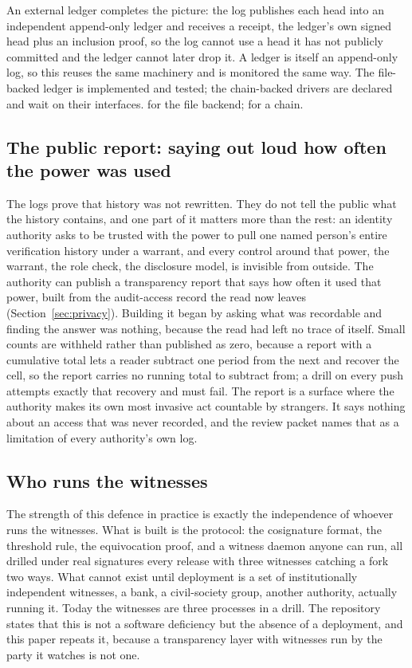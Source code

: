 An external ledger completes the picture: the log publishes each head into an independent
append-only ledger and receives a receipt, the ledger's own signed head plus an inclusion proof, so
the log cannot use a head it has not publicly committed and the ledger cannot later drop it. A
ledger is itself an append-only log, so this reuses the same machinery and is monitored the same
way. The file-backed ledger is implemented and tested; the chain-backed drivers are declared and wait
on their interfaces. \sImplMark{} for the file backend; \sFut{} for a chain.

\subsection{The public report: saying out loud how often the power was used}

The logs prove that history was not rewritten. They do not tell the public what the history
contains, and one part of it matters more than the rest: an identity authority asks to be trusted
with the power to pull one named person's entire verification history under a warrant, and every
control around that power, the warrant, the role check, the disclosure model, is invisible from
outside. The authority can publish a transparency report that says how often it
used that power, built from the audit-access record the read now leaves (Section~\ref{sec:privacy}).
Building it began by asking what was recordable and finding the answer was nothing, because the read
had left no trace of itself. Small counts are withheld rather than published as zero, because a
report with a cumulative total lets a reader subtract one period from the next and recover the cell,
so the report carries no running total to subtract from; a drill on every push attempts exactly that
recovery and must fail. The report is a surface where the authority makes its own most invasive act
countable by strangers. It says nothing about an access that was never recorded, and the review
packet names that as a limitation of every authority's own log. \sImpl

\subsection{Who runs the witnesses}

The strength of this defence in practice is exactly the independence of whoever runs the
witnesses. What is built is the protocol: the cosignature format, the threshold rule, the
equivocation proof, and a witness daemon anyone can run, all drilled under real signatures every
release with three witnesses catching a fork two ways. What cannot exist until deployment is a set
of institutionally independent witnesses, a bank, a civil-society group, another authority,
actually running it. Today the witnesses are three processes in a drill. The repository states that
this is not a software deficiency but the absence of a deployment, and this paper repeats it,
because a transparency layer with witnesses run by the party it watches is not one. \sExt

